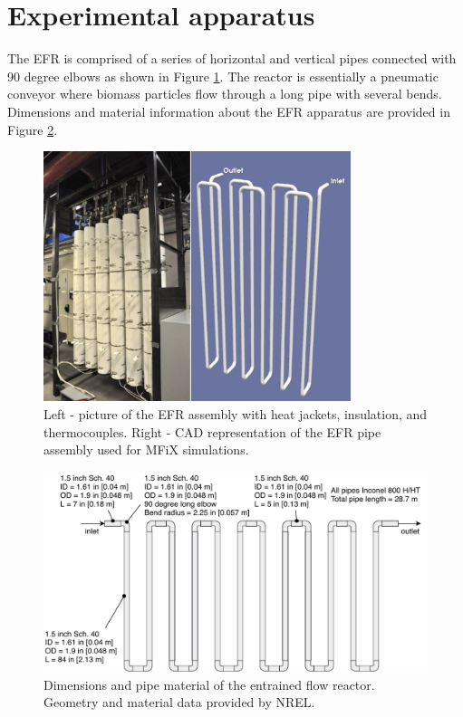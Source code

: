 
\section{Experimental apparatus}

The EFR is comprised of a series of horizontal and vertical pipes connected with 90 degree elbows as shown in Figure \ref{fig:efr-assembly}. The reactor is essentially a pneumatic conveyor where biomass particles flow through a long pipe with several bends. Dimensions and material information about the EFR apparatus are provided in Figure \ref{fig:efr-geometry}.

\begin{figure}[H]
    \centering
    \includegraphics[width=0.8\textwidth]{figures/efr-assembly.png}
    \caption{Left - picture of the EFR assembly with heat jackets, insulation, and thermocouples. Right - CAD representation of the EFR pipe assembly used for MFiX simulations.}
    \label{fig:efr-assembly}
\end{figure}

\begin{figure}[H]
    \centering
    \includegraphics[width=\textwidth]{figures/efr-geometry.pdf}
    \caption{Dimensions and pipe material of the entrained flow reactor. Geometry and material data provided by NREL.}
    \label{fig:efr-geometry}
\end{figure}

